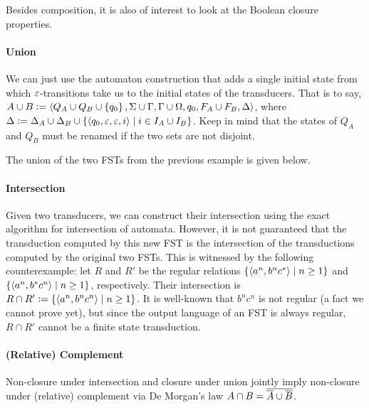 Besides composition, it is also of interest to look at the Boolean closure properties.
%
\paragraph{Union}
We can just use the automaton construction that adds a single initial state from which $\varepsilon$-transitions take us to the initial states of the transducers.
That is to say, $A \cup B \mathrel{\mathop:}= \left \langle Q_A \cup Q_B \cup \left \{ q_0 \right \}, \Sigma \cup \Gamma, \Gamma \cup \Omega, q_0, F_A \cup F_B, \Delta \right \rangle $, where
\(
    \Delta \mathrel{\mathop:}= \Delta_A \cup \Delta_B \cup
        \left \{ 
            \left \langle q_0, \varepsilon, \varepsilon, i \right \rangle  \mid i \in I_A \cup I_B
         \right \}
\).
Keep in mind that the states of $Q_A$ and $Q_B$ must be renamed if the two sets are not disjoint.
%
\begin{examplebox}
    The union of the two FSTs from the previous example is given below.
    \begin{center}
        
    \end{center}
\end{examplebox}

\paragraph{Intersection}
Given two transducers, we can construct their intersection using the exact algorithm for intersection of automata.
However, it is not guaranteed that the transduction computed by this new FST is the intersection of the transductions computed by the original two FSTs.
This is witnessed by the following counterexample: let $R$ and $R'$ be the regular relations $\left \{ \left \langle a^n, b^n c^* \right \rangle  \mid n \geq 1 \right \}$ and $\left \{ \left \langle a^n, b^* c^n \right \rangle  \mid n \geq 1 \right \}$, respectively.
Their intersection is $R \cap R' \mathrel{\mathop:}= \left \{  \left \langle a^n, b^n c^n \right \rangle  \mid n \geq 1 \right \}$.
It is well-known that $b^n c^n$ is not regular (a fact we cannot prove yet), but since the output language of an FST is always regular, $R \cap R'$ cannot be a finite state transduction.

\paragraph{(Relative) Complement}
Non-closure under intersection and closure under union jointly imply non-closure under (relative) complement via De Morgan's law $A \cap B =  \overline{ \overline{A}  \cup  \overline{B} } $.

